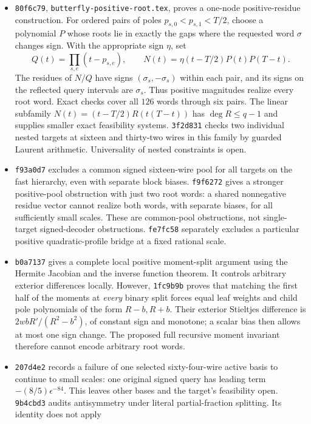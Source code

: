 \documentclass[11pt]{article}
\begin{document}
\begin{itemize}
\item \texttt{80f6c79}, \texttt{butterfly-positive-root.tex}, proves a
one-node positive-residue construction. For ordered pairs of poles
$p_{s,0}<p_{s,1}<T/2$, choose a polynomial $P$ whose roots lie in exactly
the gaps where the requested word $\sigma$ changes sign. With the
appropriate sign $\eta$, set
\[
 Q(t)=\prod_{s,e}(t-p_{s,e}),\qquad
 N(t)=\eta(t-T/2)P(t)P(T-t).
\]
The residues of $N/Q$ have signs $(\sigma_s,-\sigma_s)$ within each
pair, and its signs on the reflected query intervals are $\sigma_s$.
Thus positive magnitudes realize every root word. Exact checks cover
all $126$ words through six pairs. The linear subfamily
$N(t)=(t-T/2)R(t(T-t))$ has $\deg R\leq q-1$ and supplies smaller
exact feasibility systems. \texttt{3f2d831} checks two individual
nested targets at sixteen and thirty-two wires in this family by
guarded Laurent arithmetic. Universality of nested constraints is open.
\item \texttt{f93a0d7} excludes a common signed sixteen-wire pool for
all targets on the fast hierarchy, even with separate block biases.
\texttt{f9f6272} gives a stronger positive-pool obstruction with just
two root words: a shared nonnegative residue vector cannot realize both
words, with separate biases, for all sufficiently small scales. These
are common-pool obstructions, not single-target signed-decoder
obstructions. \texttt{fe7fc58} separately excludes a particular
positive quadratic-profile bridge at a fixed rational scale.
\item \texttt{b0a7137} gives a complete local positive moment-split
argument using the Hermite Jacobian and the inverse function theorem.
It controls arbitrary exterior differences locally. However,
\texttt{1fc9b9b} proves that matching the first half of the moments at
\emph{every} binary split forces equal leaf weights and child pole
polynomials of the form $R-b,R+b$. Their exterior Stieltjes difference
is $2wbR'/(R^2-b^2)$, of constant sign and monotone; a scalar bias
then allows at most one sign change. The proposed full recursive
moment invariant therefore cannot encode arbitrary root words.
\item \texttt{207d4e2} records a failure of one selected sixty-four-wire
active basis to continue to small scales: one original signed query
has leading term $-(8/5)\epsilon^{-84}$. This leaves other bases and
the target's feasibility open. \texttt{9b4cbd3} audits antisymmetry
under literal partial-fraction splitting. Its identity does not apply

\end{itemize}
\end{document}
